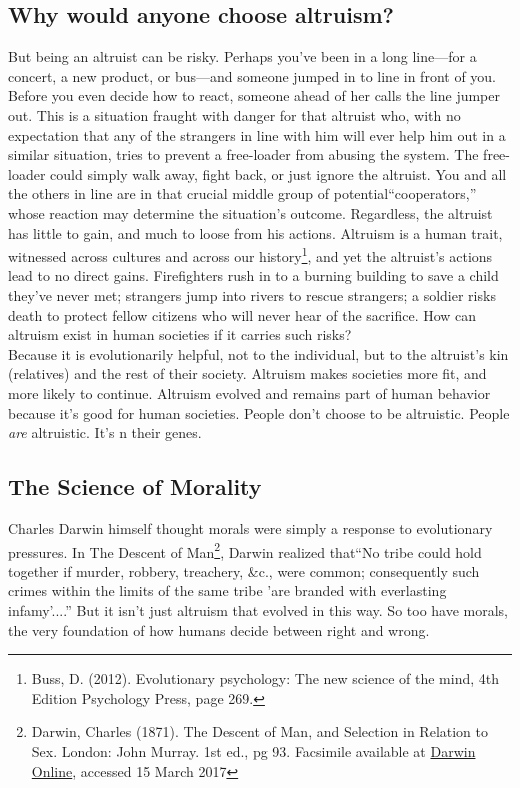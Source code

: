 \documentclass[amstex,12pt]{book}
\begin{document}
\subsection{Why would anyone choose altruism?}
But  being an altruist can be risky. Perhaps you've been in a long line---for a concert, a new product, or bus---and someone jumped in to line in front of you. Before you even decide how to react, someone ahead of her calls the line jumper out. This is a situation fraught with danger for that altruist who, with no expectation that any of the strangers in line with him will ever help him out in a similar situation, tries to prevent a free-loader from abusing the system. The free-loader could simply walk away, fight back, or just ignore the altruist. You and all the others in line are in that crucial middle group of potential``cooperators,'' whose reaction may determine the situation's outcome. Regardless, the altruist has little to gain, and much to loose from his actions. Altruism is a human trait, witnessed across cultures and across our history\footnote{Buss, D. (2012). Evolutionary psychology: The new science of the mind, 4th Edition Psychology Press, page 269.}, and yet the altruist's actions lead to no direct gains. Firefighters rush in to a burning building to save a child they've never met; strangers jump into rivers to rescue strangers; a soldier risks death to protect fellow citizens who will never hear of the sacrifice. How can altruism exist in human societies if it carries such risks? \\

Because it is evolutionarily helpful, not to the individual, but to the altruist's kin (relatives) and the rest of their society. Altruism makes societies more fit, and more likely to continue. Altruism evolved and remains part of human behavior because it's good for human societies. People don't choose to be altruistic. People \emph{are} altruistic. It's n their genes.\\

\subsection{The Science of Morality}\label{moral_science}
Charles Darwin himself thought morals were simply a response to evolutionary pressures. In The Descent of Man\footnote{Darwin, Charles (1871). The Descent of Man, and Selection in Relation to Sex. London: John Murray. 1st ed., pg 93. Facsimile available at \href{http://darwin-online.org.uk/EditorialIntroductions/Freeman_TheDescentofMan.html}{Darwin Online}, accessed 15 March 2017}, Darwin realized that``No tribe could hold together if murder, robbery, treachery, \&c., were common; consequently such crimes within the limits of the same tribe 'are branded with everlasting infamy'....'' But it isn't just altruism that evolved in this way. So too have morals, the very foundation of how humans decide between right and wrong. 
  
\end{document}
